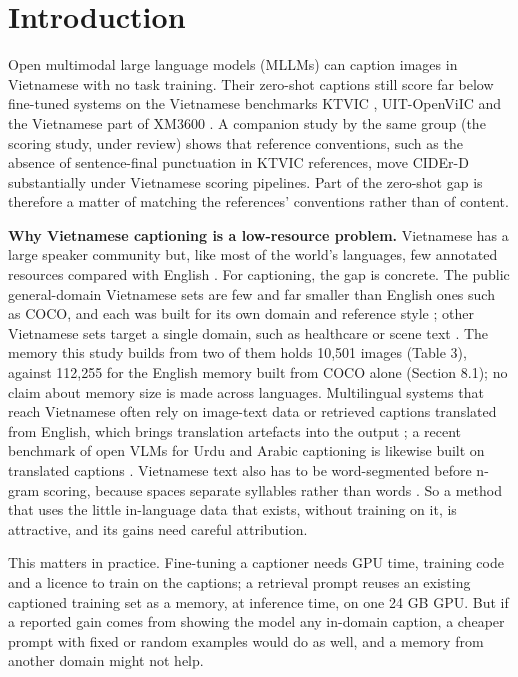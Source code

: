 \section{Introduction}\label{introduction}

Open multimodal large language models (MLLMs) can caption images in Vietnamese with no task
training. Their zero-shot captions still score far below fine-tuned systems on the Vietnamese
benchmarks KTVIC \citep{Pham2024KTVIC}, UIT-OpenViIC \citep{Bui2023OpenViIC, Bui2026OpenViICJournal}
and the Vietnamese part of XM3600 \citep{Thapliyal2022XM3600}. A companion study by the same group
(the scoring study, under review) shows that reference conventions, such as the absence of
sentence-final punctuation in KTVIC references, move CIDEr-D \citep{Vedantam2015CIDEr} substantially
under Vietnamese scoring pipelines. Part of the zero-shot gap is therefore a matter of matching the
references' conventions rather than of content.

\textbf{Why Vietnamese captioning is a low-resource problem.} Vietnamese has a large speaker
community but, like most of the world's languages, few annotated resources compared with English
\citep{Joshi2020StateFate}. For captioning, the gap is concrete. The public general-domain
Vietnamese sets are few and far smaller than English ones such as COCO, and each was built for its
own domain and reference style
\citep{Lam2020UITViIC, Pham2024KTVIC, Bui2023OpenViIC, Hoang2026HDUCap}; other Vietnamese sets
target a single domain, such as healthcare \citep{Nguyen2022VieCap4H} or scene text
\citep{Nguyen2026ViTextCaps}. The memory this study builds from two of them holds 10,501 images
(Table 3), against 112,255 for the English memory built from COCO alone (Section 8.1); no claim
about memory size is made across languages. Multilingual systems that reach Vietnamese often rely on
image-text data or retrieved captions translated from English, which brings translation artefacts
into the output \citep{Vu2025VELVET, Ibrahim2025CONCAP}; a recent benchmark of open VLMs for Urdu
and Arabic captioning is likewise built on translated captions \citep{Hussain2026SciRepLVLM}.
Vietnamese text also has to be word-segmented before n-gram scoring, because spaces separate
syllables rather than words \citep{Vu2018VnCoreNLP}. So a method that uses the little in-language
data that exists, without training on it, is attractive, and its gains need careful attribution.

This matters in practice. Fine-tuning a captioner needs GPU time, training code and a licence to
train on the captions; a retrieval prompt reuses an existing captioned training set as a memory, at
inference time, on one 24 GB GPU. But if a reported gain comes from showing the model any in-domain
caption, a cheaper prompt with fixed or random examples would do as well, and a memory from another
domain might not help.

